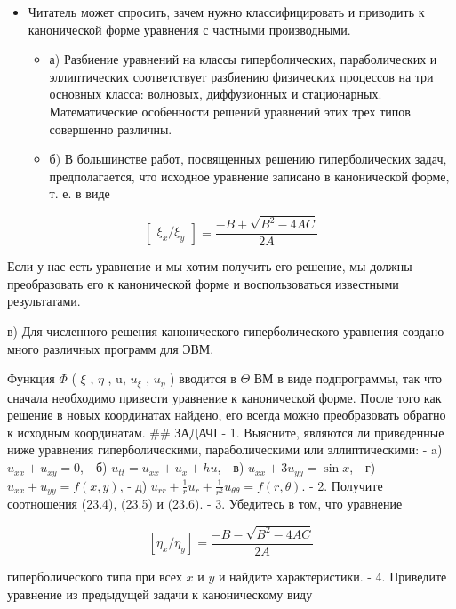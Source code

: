 \documentclass[
  ukrainian,
]{article}
\providecommand{\tightlist}{%
  \setlength{\itemsep}{0pt}\setlength{\parskip}{0pt}}
\begin{document}
\begin{itemize}
\tightlist
\item
  Читатель может спросить, зачем нужно классифицировать и приводить к
  канонической форме уравнения с частными производными.

  \begin{itemize}
  \tightlist
  \item
    а) Разбиение уравнений на классы гиперболических, параболических и
    эллиптических соответствует разбиению физических процессов на три
    основных класса: волновых, диффузионных и стационарных.
    Математические особенности решений уравнений этих трех типов
    совершенно различны.
  \item
    б) В большинстве работ, посвященных решению гиперболических задач,
    предполагается, что исходное уравнение записано в канонической
    форме, т. е. в виде
  \end{itemize}
\end{itemize}

\[
\begin{bmatrix} \xi_x/\xi_y \end{bmatrix} = \frac{-B + \sqrt{B^2 - 4AC}}{2A}
\]

Если у нас есть уравнение и мы хотим получить его решение, мы должны
преобразовать его к канонической форме и воспользоваться известными
результатами.

в) Для численного решения канонического гиперболического уравнения
создано много различных программ для ЭВМ.

Функция \(\Phi\) ( \(\xi\) , \(\eta\) , u, \(u_{\xi}\) , \(u_{\eta}\) )
вводится в \(\Theta\) ВМ в виде подпрограммы, так что сначала необходимо
привести уравнение к канонической форме. После того как решение в новых
координатах найдено, его всегда можно преобразовать обратно к исходным
координатам. \#\# ЗАДАЧІ - 1. Выясните, являются ли приведенные ниже
уравнения гиперболическими, параболическими или эллиптическими: - a)
\(u_{xx}+u_{xy}=0\), - б) \(u_{tt}=u_{xx}+u_x+hu\), - в)
\(u_{xx}+3u_{yy}=\sin x\), - г) \(u_{xx}+u_{yy}=f(x,y)\), - д)
\(u_{rr}+\frac{1}{r}u_r+\frac{1}{r^2}u_{\theta\theta}=f(r,\theta)\). -
2. Получите соотношения (23.4), (23.5) и (23.6). - 3. Убедитесь в том,
что уравнение

\[
[\eta_x/\eta_y] = \frac{-B - \sqrt{B^2 - 4AC}}{2A}
\]

гиперболического типа при всех \(x\) и \(y\) и найдите характеристики. -
4. Приведите уравнение из предыдущей задачи к каноническому виду
\end{document}
